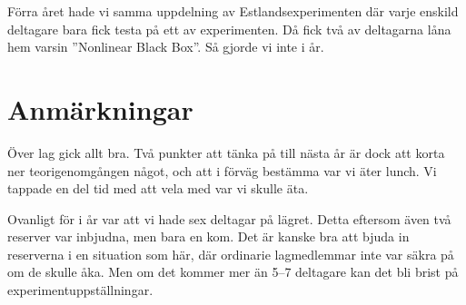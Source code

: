 \documentclass[11pt,a4paper, 
english, swedish %
]{article}
\begin{document}
Förra året hade vi samma uppdelning av Estlandsexperimenten där varje
enskild deltagare bara fick testa på ett av experimenten. Då fick
två av deltagarna låna hem varsin ''Nonlinear Black Box''. Så gjorde
vi inte i år. 



\section*{Anmärkningar}
Över lag gick allt bra. Två punkter att tänka på till nästa år är dock
att korta ner teorigenomgången något, och att i förväg bestämma var vi
äter lunch. Vi tappade en del tid med att vela med var vi skulle äta. 

Ovanligt för i år var att vi hade sex deltagar på lägret. Detta
eftersom även två reserver var inbjudna, men bara en kom. Det är
kanske bra att bjuda in reserverna i en situation som här, där
ordinarie lagmedlemmar inte var säkra på om de skulle åka. Men om det
kommer mer än 5--7 deltagare kan det bli brist på
experimentuppställningar. 





\end{document}
